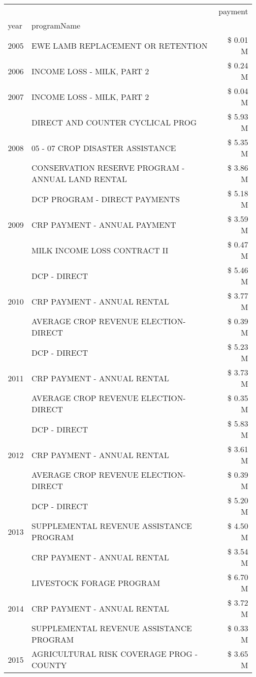 \begin{tabular}{llr}
\toprule
 &  & payment \\
year & programName &  \\
\midrule
2005 & EWE LAMB REPLACEMENT OR RETENTION & \$ 0.01 M \\
\cline{1-3}
2006 & INCOME LOSS - MILK, PART 2 & \$ 0.24 M \\
\cline{1-3}
2007 & INCOME LOSS - MILK, PART 2 & \$ 0.04 M \\
\cline{1-3}
\multirow[t]{3}{*}{2008} & DIRECT AND COUNTER CYCLICAL PROG & \$ 5.93 M \\
 & 05 - 07 CROP DISASTER ASSISTANCE & \$ 5.35 M \\
 & CONSERVATION RESERVE PROGRAM - ANNUAL LAND RENTAL & \$ 3.86 M \\
\cline{1-3}
\multirow[t]{3}{*}{2009} & DCP PROGRAM - DIRECT PAYMENTS & \$ 5.18 M \\
 & CRP PAYMENT - ANNUAL PAYMENT & \$ 3.59 M \\
 & MILK INCOME LOSS CONTRACT II & \$ 0.47 M \\
\cline{1-3}
\multirow[t]{3}{*}{2010} & DCP - DIRECT & \$ 5.46 M \\
 & CRP PAYMENT - ANNUAL RENTAL & \$ 3.77 M \\
 & AVERAGE CROP REVENUE ELECTION-DIRECT & \$ 0.39 M \\
\cline{1-3}
\multirow[t]{3}{*}{2011} & DCP - DIRECT & \$ 5.23 M \\
 & CRP PAYMENT - ANNUAL RENTAL & \$ 3.73 M \\
 & AVERAGE CROP REVENUE ELECTION-DIRECT & \$ 0.35 M \\
\cline{1-3}
\multirow[t]{3}{*}{2012} & DCP - DIRECT & \$ 5.83 M \\
 & CRP PAYMENT - ANNUAL RENTAL & \$ 3.61 M \\
 & AVERAGE CROP REVENUE ELECTION-DIRECT & \$ 0.39 M \\
\cline{1-3}
\multirow[t]{3}{*}{2013} & DCP - DIRECT & \$ 5.20 M \\
 & SUPPLEMENTAL REVENUE ASSISTANCE PROGRAM & \$ 4.50 M \\
 & CRP PAYMENT - ANNUAL RENTAL & \$ 3.54 M \\
\cline{1-3}
\multirow[t]{3}{*}{2014} & LIVESTOCK FORAGE PROGRAM & \$ 6.70 M \\
 & CRP PAYMENT - ANNUAL RENTAL & \$ 3.72 M \\
 & SUPPLEMENTAL REVENUE ASSISTANCE PROGRAM & \$ 0.33 M \\
\cline{1-3}
\multirow[t]{3}{*}{2015} & AGRICULTURAL RISK COVERAGE PROG - COUNTY & \$ 3.65 M \\

\end{tabular}
